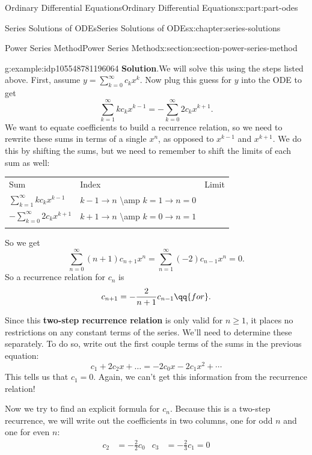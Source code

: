 \documentclass[oneside,10pt,]{book}
\newcommand{\blocktitlefont}{\relax}
\newcommand{\tabularfont}{\relax}
\newcommand{\terminology}[1]{\textbf{#1}}
\numberwithin{equation}{part}
\newcommand{\hrulethick} {\noalign{\hrule height 0.11em}}
\newcommand{\amp}{&}
\begin{document}
\begin{partptx}{Ordinary Differential Equations}{}{Ordinary Differential Equations}{}{}{x:part:part-odes}
\begin{chapterptx}{Series Solutions of ODEs}{}{Series Solutions of ODEs}{}{}{x:chapter:series-solutions}
\begin{sectionptx}{Power Series Method}{}{Power Series Method}{}{}{x:section:section-power-series-method}
\begin{example}{}{g:example:idp105548781196064}
\noindent\textbf{\blocktitlefont Solution}.\hypertarget{g:solution:idp105548781196960}{}\quad{}We will solve this using the steps listed above. First, assume \(y = \sum_{k=0}^{\infty}c_{k}x^{k}\). Now plug this guess for \(y\) into the ODE to get%
\begin{equation*}
\sum_{k=1}^{\infty}kc_{k}x^{k-1} = -\sum_{k=0}^{\infty}2c_{k}x^{k+1}.
\end{equation*}
We want to equate coefficients to build a recurrence relation, so we need to rewrite these sums in terms of a single \(x^{n}\), as opposed to \(x^{k-1}\) and \(x^{k+1}\). We do this by shifting the sums, but we need to remember to shift the limits of each sum as well:%
\begin{center}%
{\tabularfont%
\begin{tabular}{lll}\hrulethick
Sum&Index&Limit\tabularnewline\hrulethick
\(\sum_{k=1}^{\infty}kc_{k}x^{k-1}\)&\(k-1\to n\) \textbackslash{}amp \(k=1\to n=0\)\tabularnewline[0pt]
\(-\sum_{k=0}^{\infty}2c_{k}x^{k+1}\)&\(k+1\to n\) \textbackslash{}amp \(k=0\to n=1\)\tabularnewline\hrulethick
\end{tabular}
}%
\end{center}%
So we get%
\begin{equation*}
\sum_{n=0}^{\infty}(n+1)c_{n+1}x^{n} = \sum_{n=1}^{\infty}(-2)c_{n-1}x^{n} = 0.
\end{equation*}
So a recurrence relation for \(c_{n}\) is%
\begin{equation*}
c_{n+1} = -\frac{2}{n+1}c_{n-1}\qq{for }.
\end{equation*}
%
\par
Since this \terminology{two-step recurrence relation} is only valid for \(n\geq1\), it places no restrictions on any constant terms of the series. We'll need to determine these separately. To do so, write out the first couple terms of the sums in the previous equation:%
\begin{equation*}
c_{1}+2c_{2}x+\dots = -2c_{0}x -2c_{1}x^{2}+\cdots
\end{equation*}
This tells us that \(c_{1} = 0\). Again, we can't get this information from the recurrence relation!%
\par
Now we try to find an explicit formula for \(c_{n}\). Because this is a two-step recurrence, we will write out the coefficients in two columns, one for odd \(n\) and one for even \(n\):%
\begin{align*}
c_{2} \amp= -\frac{2}{2}c_{0} \amp c_{3} \amp= -\frac{2}{3}c_{1} = 0\\

\end{align*}
\end{example}
\end{sectionptx}
\end{chapterptx}
\end{partptx}
\end{document}
